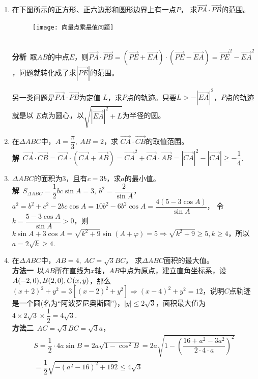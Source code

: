\begin{enumerate}[label={【\textbf{例\thechapter.\arabic*}】},
 leftmargin=\inteval{\myenumleftmargin}pt,
 itemsep=\inteval{\myenumitempsep}pt,
 itemindent=\inteval{\myenumitemindent}pt]
\item 在下图所示的正方形、正六边形和圆形边界上有一点$ P $，
求$ \vec{PA} \cdot \vec{PB} $的范围。
\begin{figure}[h]
    \centering
    \texttt{[image: 向量点乘最值问题]}
\end{figure} \\
\textbf{分析}\ 取$ AB $的中点$ E $，则$ \vec{PA}\cdot\vec{PB}
= \left(\vec{PE}+\vec{EA}\right)\cdot \left(
\vec{PE}-\vec{EA}\right) = \vec{PE}^2-
\vec{EA}^2 $，问题就转化成了求$ |\vec{PE}| $的范围。

另一类问题是$ \vec{PA}\cdot\vec{PB} $为定值
$ L $，求$ P $点的轨迹。只要$ L>-|\vec{EA}|^2 $，$ P $点的轨迹就是以
$ E $点为圆心，以$ \sqrt{|\vec{EA}|^2+L} $为半径的圆。

\item 在$ \Delta ABC $中，$ A=\dfrac{\pi}{3},\ AB=2 $，求
$ \vec{CA}\cdot\vec{CB} $的取值范围。\\
\textbf{解}\ 
$ \vec{CA}\cdot\vec{CB}=\vec{CA}\cdot(
\vec{CA}+\vec{AB})=\vec{CA}^2+
\vec{CA}\cdot\vec{AB}
=|\vec{CA}|^2-|\vec{CA}|\geq -\dfrac{1}{4} $. 

\item $ \Delta ABC $的面积为3，且有$ c=3b $，求$ a $的最小值。\\
\textbf{解}\ $ S_{\Delta ABC}=\dfrac{1}{2}bc\sin A=3,\ b^2=\dfrac{2}{\sin A} $，
$ a^2=b^2+c^2-2bc\cos A=10b^2-6b^2\cos A=\dfrac{4(5-3\cos A)}{\sin A} $，
令$ k=\dfrac{5-3\cos A}{\sin A}>0 $，则$ k\sin A+3\cos A=\sqrt{k^2+9}\sin(A+\varphi)=5 
\Rightarrow \sqrt{k^2+9}\geq 5, k\geq 4 $，所以$ a=2\sqrt{k}\geq 4 $. 

\item 在$ \Delta ABC $中，$ AB=4,\ AC=\sqrt{3}BC $，
求$ \Delta ABC $面积的最大值。\\
\textbf{方法一}\ 以$ AB $所在直线为$ x $轴，$ AB $中点为原点，建立直角坐标系，设
$ A(-2,0),B(2,0),\\ C(x,y) $，那么$ (x+2)^2+y^2=3[(x-2)^2+y^2] \Rightarrow
(x-4)^2+y^2=12 $，说明$ C $点轨迹是一个圆(名为“阿波罗尼奥斯圆”)，$ |y|\leq 
2\sqrt{3} $，面积最大值为$ 4\times 2\sqrt{3} \times \dfrac{1}{2}=4\sqrt{3} $. \\
\textbf{方法二}\ $ AC=\sqrt{3}BC=\sqrt{3}a $，
\begin{gather*}
    S=\dfrac{1}{2}\cdot 4 a\sin B=2a\sqrt{1-\cos^2B}=2a\sqrt{1-\left(
        \dfrac{16+a^2-3a^2}{2\cdot4\cdot a}\right)^2} \\
    =\dfrac{1}{2}\sqrt{-(a^2-16)^2+192}\leq 4\sqrt{3}
\end{gather*}


\end{enumerate}

